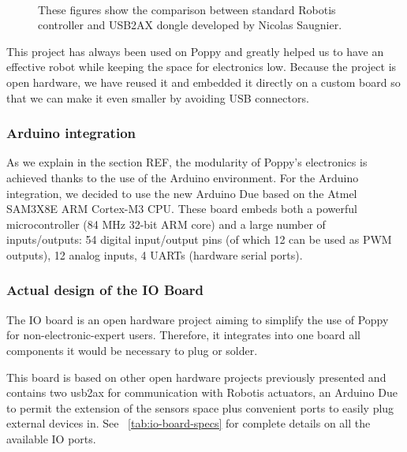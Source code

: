 \begin{figure}[tb]
\centering
    \hfil
    \\

    \caption{These figures show the comparison between standard Robotis controller and USB2AX dongle developed by Nicolas Saugnier. }
    \label{fig:usb2ax}
\end{figure}

This project has always been used on Poppy and greatly helped us to have an effective robot while keeping the space for electronics low.
Because the project is open hardware, we have reused it and embedded it directly on a custom board so that we can make it even smaller by avoiding USB connectors.

\subsubsection{Arduino integration} %
As we explain in the section REF, the modularity of Poppy’s electronics is achieved thanks to the use of the Arduino environment. For the Arduino integration, we decided to use the new Arduino Due based on the Atmel SAM3X8E ARM Cortex-M3 CPU. These board embeds both a powerful microcontroller (84 MHz 32-bit ARM core) and a large number of inputs/outputs: 54 digital input/output pins (of which 12 can be used as PWM outputs), 12 analog inputs, 4 UARTs (hardware serial ports).


\subsubsection{Actual design of the IO Board} %
The IO board is an open hardware project aiming to simplify the use of Poppy for non-electronic-expert users. Therefore, it integrates into one board all components it would be necessary to plug or solder.


This board is based on other open hardware projects previously presented and contains two usb2ax for communication with Robotis actuators, an Arduino Due to permit the extension of the sensors space plus convenient ports to easily plug external devices in. See \figurename~\ref{tab:io-board-specs} for complete details on all the available IO ports.

